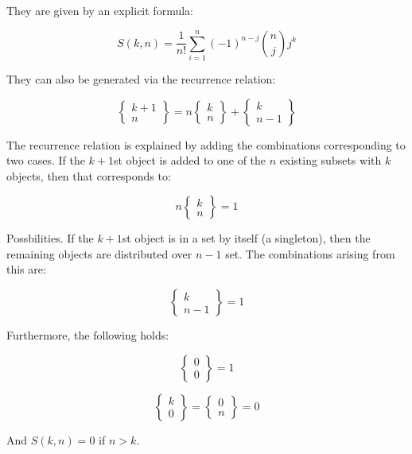 They are given by an explicit formula:

\begin{equation}
S(k,n) = \frac{1}{n!}\sum_{i=1}^n (-1)^{n-j} {n \choose j}j^k
\end{equation}

They can also be generated via the recurrence relation:

\begin{equation}
\left\{\begin{array}{c}k+1\\n\end{array}\right\} = n\left\{\begin{array}{c}k\\n\end{array}\right\} + \left\{\begin{array}{c}k\\n-1\end{array}\right\}
\end{equation}

The recurrence relation is explained by adding the combinations corresponding to two cases. If the $k+1$st object is added to one of the $n$ existing subsets with $k$ objects, then that corresponds to:

\begin{equation}
n\left\{\begin{array}{c}k\\n\end{array}\right\} = 1
\end{equation}

Possbilities. If the $k+1$st object is in a set by itself (a singleton), then the remaining objects are distributed over $n-1$ set. The combinations arising from this are:

\begin{equation}
\left\{\begin{array}{c}k\\n-1\end{array}\right\} = 1
\end{equation}

Furthermore, the following holds:

\begin{equation}
\left\{\begin{array}{c}0\\0\end{array}\right\} = 1
\end{equation}

\begin{equation}
\left\{\begin{array}{c}k\\0\end{array}\right\} = \left\{\begin{array}{c}0\\n\end{array}\right\} = 0
\end{equation}

And $S(k,n) = 0$ if $n>k$.





